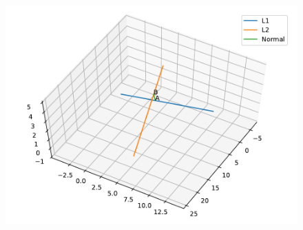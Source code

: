 \documentclass[12pt]{article}
\begin{document}
\begin{enumerate}
\begin{figure}[!h]
\begin{center}
		\includegraphics[width=\columnwidth]{figs/problem30.pdf}
	\end{center}
\caption{}
\label{fig:Fig1}
\end{figure}
\end{enumerate}
\end{document}
